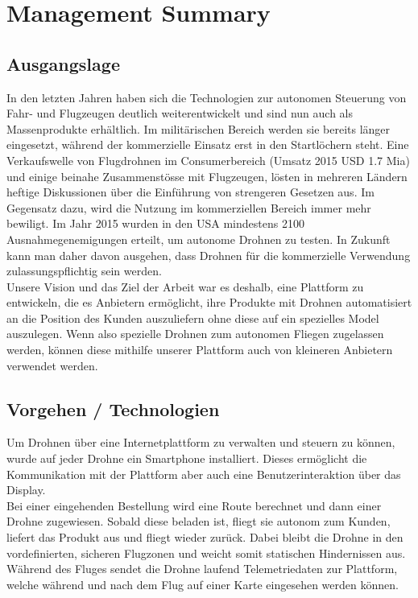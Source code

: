 \newpage
{}
\chapter*{Management Summary}
\section*{Ausgangslage}
In den letzten Jahren haben sich die Technologien zur autonomen Steuerung von Fahr- und Flugzeugen deutlich weiterentwickelt und sind nun auch als Massenprodukte erhältlich. Im militärischen Bereich werden sie bereits länger eingesetzt, während der kommerzielle Einsatz erst in den Startlöchern steht. Eine Verkaufswelle von Flugdrohnen im Consumerbereich (Umsatz 2015 USD 1.7 Mia) \cite{droneNZZ} und einige beinahe Zusammenstösse mit Flugzeugen, lösten in mehreren Ländern heftige Diskussionen über die Einführung von strengeren Gesetzen aus. Im Gegensatz dazu, wird die Nutzung im kommerziellen Bereich immer mehr bewiligt. Im Jahr 2015 wurden in den USA mindestens 2100 \cite{perm} Ausnahmegenemigungen erteilt, um autonome Drohnen zu testen. In Zukunft kann man daher davon ausgehen, dass Drohnen für die kommerzielle Verwendung zulassungspflichtig sein werden.
\\
Unsere Vision und das Ziel der Arbeit war es deshalb, eine Plattform zu entwickeln, die es Anbietern ermöglicht, ihre Produkte mit Drohnen automatisiert an die Position des Kunden auszuliefern ohne diese auf ein spezielles Model auszulegen. Wenn also spezielle Drohnen zum autonomen Fliegen zugelassen werden, können diese mithilfe unserer Plattform auch von kleineren Anbietern verwendet werden.
\section*{Vorgehen / Technologien}
Um Drohnen über eine Internetplattform zu verwalten und steuern zu können, wurde auf jeder Drohne ein Smartphone installiert. Dieses ermöglicht die Kommunikation mit der Plattform aber auch eine Benutzerinteraktion über das Display.
\\
Bei einer eingehenden Bestellung wird eine Route berechnet und dann einer Drohne zugewiesen. Sobald diese beladen ist, fliegt sie autonom zum Kunden, liefert das Produkt aus und fliegt wieder zurück. Dabei bleibt die Drohne in den vordefinierten, sicheren Flugzonen und weicht somit statischen Hindernissen aus. Während des Fluges sendet die Drohne laufend Telemetriedaten zur Plattform, welche während und nach dem Flug auf einer Karte eingesehen werden können.

